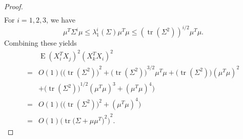 \documentclass[review]{elsarticle}
\DeclareMathOperator{\mytr}{tr}
\DeclareMathOperator{\myE}{E}
\theoremstyle{plain}
\theoremstyle{definition}
\theoremstyle{remark}
\begin{document}
\begin{proof}
\begin{equation*}
\begin{aligned}
        \end{aligned}
    \end{equation*}
    For $i=1,2,3$, we have
    \begin{equation*}
    \mu^T \Sigma^i \mu
    \leq \lambda_{1}^i(\Sigma)\mu^T\mu
    \leq {(\mytr (\Sigma^2))}^{i/2}\mu^T\mu.
    \end{equation*}
        Combining these yields
        \begin{equation*}
        \begin{aligned}
            &\myE{(X_i^T X_j)}^2{(X_k^T X_i)}^2\\
            =&
            O(1)\Big({\big(\mytr (\Sigma^2)\big)}^2+
            {\big(\mytr (\Sigma^2)\big)}^{3/2}\mu^T \mu+
            {\big(\mytr (\Sigma^2)\big)}{(\mu^T \mu)}^2\\
            &+
            {\big(\mytr (\Sigma^2)\big)}^{1/2}{(\mu^T \mu)}^3+
            {(\mu^T \mu)}^4
            \Big)\\
            =&O(1)
            \Big(\big(\mytr(\Sigma^2)\big)^2 + (\mu^T \mu)^4 \Big)\\
            =& O(1){\Big(\mytr {\big(\Sigma+\mu\mu^T\big)}^2\Big)}^2.
        \end{aligned}
        \end{equation*}
\end{proof}
\end{document}
